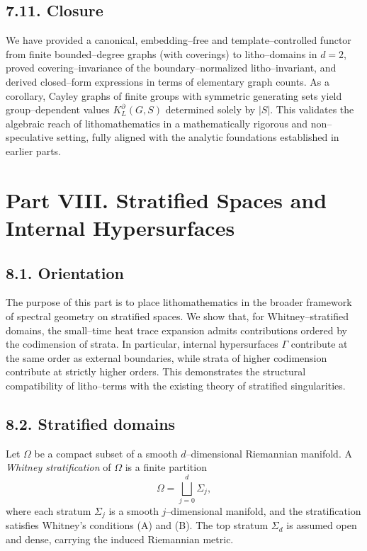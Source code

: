 \subsection*{7.11. Closure}
We have provided a canonical, embedding–free and template–controlled functor from finite bounded–degree graphs (with coverings) to litho–domains in $d=2$, proved covering–invariance of the boundary–normalized litho–invariant, and derived closed–form expressions in terms of elementary graph counts. As a corollary, Cayley graphs of finite groups with symmetric generating sets yield group–dependent values $K_L^\partial(G,S)$ determined solely by $|S|$. This validates the algebraic reach of lithomathematics in a mathematically rigorous and non–speculative setting, fully aligned with the analytic foundations established in earlier parts.

\section*{Part VIII. Stratified Spaces and Internal Hypersurfaces}

\subsection*{8.1. Orientation}
The purpose of this part is to place lithomathematics in the broader framework of spectral geometry on stratified spaces. We show that, for Whitney–stratified domains, the small–time heat trace expansion admits contributions ordered by the codimension of strata. In particular, internal hypersurfaces $\Gamma$ contribute at the same order as external boundaries, while strata of higher codimension contribute at strictly higher orders. This demonstrates the structural compatibility of litho–terms with the existing theory of stratified singularities.

\subsection*{8.2. Stratified domains}
\begin{definition}
Let $\Omega$ be a compact subset of a smooth $d$–dimensional Riemannian manifold. A \emph{Whitney stratification} of $\Omega$ is a finite partition
\[
\Omega = \bigsqcup_{j=0}^d \Sigma_j,
\]
where each stratum $\Sigma_j$ is a smooth $j$–dimensional manifold, and the stratification satisfies Whitney’s conditions (A) and (B). The top stratum $\Sigma_d$ is assumed open and dense, carrying the induced Riemannian metric.
\end{definition}

